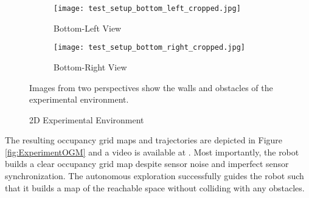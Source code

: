 \begin{figure}
	\centering
    	\begin{subfigure}[b]{0.45\textwidth}
        		\texttt{[image: test\_setup\_bottom\_left\_cropped.jpg]}
        		\caption{Bottom-Left View}
        		\label{fig:Experiment_blv}
    	\end{subfigure}
	\hspace*{0.05\columnwidth}
	\begin{subfigure}[b]{0.45\textwidth}
        		\texttt{[image: test\_setup\_bottom\_right\_cropped.jpg]}
        		\caption{Bottom-Right View}
        		\label{fig:Experiment_brv}
    	\end{subfigure}
\caption{2D Experimental Environment}
	\medskip
	\small
	Images from two perspectives show the walls and obstacles of the experimental environment.
\label{fig:ExpSetupPhoto}
\end{figure}


The resulting occupancy grid maps and trajectories are depicted in Figure \ref{fig:ExperimentOGM} and a video is available at \href{https://www.youtube.com/watch?v=CRQfhhICSj0&feature=youtu.be}{}. Most importantly, the robot builds a clear occupancy grid map despite sensor noise and imperfect sensor synchronization. The autonomous exploration successfully guides the robot such that it builds a map of the reachable space without colliding with any obstacles.

